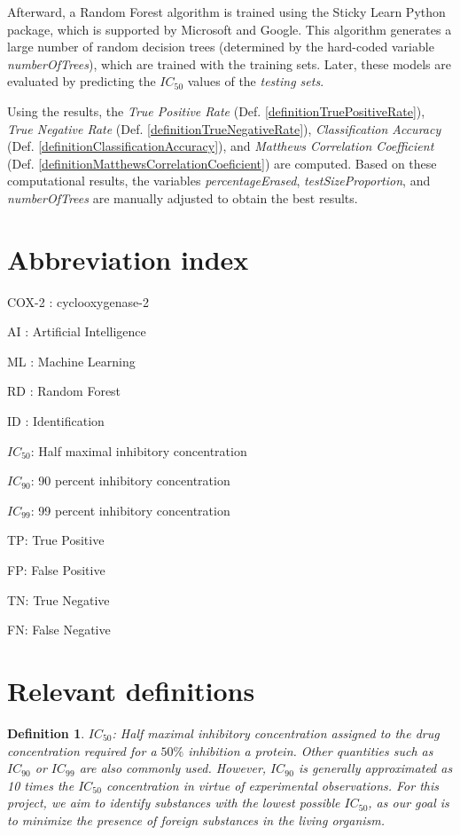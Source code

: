 \documentclass[12pt,letterpaper]{article}
\newtheorem{definition}{Definition}
\begin{document}
\begin{multicols}{2}
Afterward, a Random Forest algorithm is trained using the Sticky Learn \cite{PythonPackageStickitLearn} Python package, which is supported by Microsoft and Google. This algorithm generates a large number of random decision trees (determined by the hard-coded variable \emph{numberOfTrees}), which are trained with the training sets. Later, these models are evaluated by predicting the $IC_{50}$ values of the \emph{testing sets}.

Using the results, the \emph{True Positive Rate} (Def. \ref{definitionTruePositiveRate}), \emph{True Negative Rate} (Def. \ref{definitionTrueNegativeRate}), \emph{Classification Accuracy} (Def. \ref{definitionClassificationAccuracy}), and \emph{Matthews Correlation Coefficient} (Def. \ref{definitionMatthewsCorrelationCoeficient}) are computed. Based on these computational results, the variables \emph{percentageErased}, \emph{testSizeProportion}, and \emph{numberOfTrees} are manually adjusted to obtain the best results.



 
\section{Abbreviation index}
COX-2 : cyclooxygenase-2\par
AI : Artificial Intelligence\par
ML : Machine Learning\par
RD : Random Forest\par
ID : Identification\par
$IC_{50}$: Half maximal inhibitory concentration \par
$IC_{90}$: 90 percent inhibitory concentration \par
$IC_{99}$: 99 percent inhibitory concentration \par
TP: True Positive\par
FP: False Positive\par
TN: True Negative\par
FN: False Negative
\appendix
\section{Relevant definitions}
\begin{definition}\label{definitionIC50}
$IC_{50}$: Half maximal inhibitory concentration assigned to the drug concentration required for a $50\%$ inhibition a protein. Other quantities such as $IC_{90}$ or $IC_{99}$ are also commonly used. However, $IC_{90}$ is generally approximated as 10 times the $IC_{50}$ concentration in virtue of experimental observations\cite{BookIC50}. For this project, we aim to identify substances with the lowest possible $IC_{50}$, as our goal is to minimize the presence of foreign substances in the living organism.
\end{definition}


\end{multicols}
\end{document}
